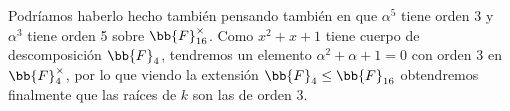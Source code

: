 \begin{ejemplo}
\begin{itemize}
            Podríamos haberlo hecho también pensando también en que $\alpha^5$ tiene orden 3 y $\alpha^3$ tiene orden 5 sobre $\bb{F}_{16}^{\times}$. Como $x^2+x+1$ tiene cuerpo de descomposición $\bb{F}_4$, tendremos un elemento $\alpha^2 +\alpha+1=0$  con orden 3 en $\bb{F}_4^\times$, por lo que viendo la extensión $\bb{F}_4\leq \bb{F}_{16}$ obtendremos finalmente que las raíces de $k$ son las de orden 3.
    \end{itemize}
\end{ejemplo}


